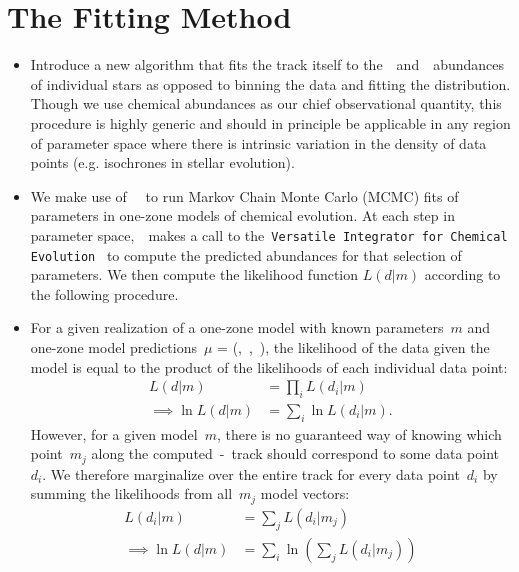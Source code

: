 \documentclass[ms.tex]{subfiles}
\begin{document}
\section{The Fitting Method}
\label{sec:fitting}

\begin{itemize}

	\item Introduce a new algorithm that fits the track itself to
	the~\feh~and~\afe~abundances of individual stars as opposed to binning the
	data and fitting the distribution.
	Though we use chemical abundances as our chief observational quantity, this
	procedure is highly generic and should in principle be applicable in any
	region of parameter space where there is intrinsic variation in the density
	of data points (e.g. isochrones in stellar evolution).

	\item We make use of~\mc~\cite{Foreman-Mackey2013} to run Markov Chain
	Monte Carlo (MCMC) fits of parameters in one-zone models of chemical
	evolution.
	At each step in parameter space,~\mc~makes a call to the~\texttt{Versatile
	Integrator for Chemical Evolution}~\citep[\vice;][]{Johnson2020,
	Griffith2021, Johnson2021} to compute the predicted abundances for that
	selection of parameters.
	We then compute the likelihood function $L(d|m)$ according to the following
	procedure.

	\item For a given realization of a one-zone model with known parameters~$m$
	and one-zone model predictions~$\mu$ = (\feh,~\afe,~\logage), the
	likelihood of the data given the model is equal to the product of the
	likelihoods of each individual data point:
	\begin{subequations}\begin{align}
	L(d|m) &= \prod_i L(d_i|m)
	\\
	\implies \ln L(d|m) &= \sum_i \ln L(d_i|m).
	\end{align}\end{subequations}
	However, for a given model~$m$, there is no guaranteed way of knowing
	which point~$m_j$ along the computed~\afe-\feh~track should correspond to
	some data point~$d_i$.
	We therefore marginalize over the entire track for every data point~$d_i$
	by summing the likelihoods from all~$m_j$ model vectors:
	\begin{subequations}\begin{align}
	L(d_i|m) &= \sum_j L(d_i|m_j)
	\\
	\implies \ln L(d|m) &= \sum_i \ln \left(\sum_j L(d_i|m_j)\right)
	\end{align}\end{subequations}


\end{itemize}
\end{document}
